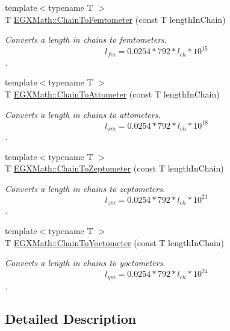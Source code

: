 \begin{DoxyCompactItemize}
{\footnotesize template$<$typename T $>$ }\\T \mbox{\hyperlink{group___e_g_x_math-_conversions-_length_conversions-_surveyors-_chain-_s_i_ga21bde6f9a920aced344185d4ed645183}{E\+G\+X\+Math\+::\+Chain\+To\+Femtometer}} (const T length\+In\+Chain)
\begin{DoxyCompactList}\small\item\em Converts a length in chains to femtometers. \[ l_{fm}=0.0254 * 792 * l_{ch} * 10^{15} \]. \end{DoxyCompactList}\item 
{\footnotesize template$<$typename T $>$ }\\T \mbox{\hyperlink{group___e_g_x_math-_conversions-_length_conversions-_surveyors-_chain-_s_i_ga1e983c3063080200438c09bdafa20e02}{E\+G\+X\+Math\+::\+Chain\+To\+Attometer}} (const T length\+In\+Chain)
\begin{DoxyCompactList}\small\item\em Converts a length in chains to attometers. \[ l_{am}=0.0254 * 792 * l_{ch} * 10^{18} \]. \end{DoxyCompactList}\item 
{\footnotesize template$<$typename T $>$ }\\T \mbox{\hyperlink{group___e_g_x_math-_conversions-_length_conversions-_surveyors-_chain-_s_i_ga5c9f25b27d059b6b458111270a20209a}{E\+G\+X\+Math\+::\+Chain\+To\+Zeptometer}} (const T length\+In\+Chain)
\begin{DoxyCompactList}\small\item\em Converts a length in chains to zeptometers. \[ l_{zm}=0.0254 * 792 * l_{ch} * 10^{21} \]. \end{DoxyCompactList}\item 
{\footnotesize template$<$typename T $>$ }\\T \mbox{\hyperlink{group___e_g_x_math-_conversions-_length_conversions-_surveyors-_chain-_s_i_gafcc220586dd2018bb921f109efa11d06}{E\+G\+X\+Math\+::\+Chain\+To\+Yoctometer}} (const T length\+In\+Chain)
\begin{DoxyCompactList}\small\item\em Converts a length in chains to yoctometers. \[ l_{ym}=0.0254 * 792 * l_{ch} * 10^{24} \]. \end{DoxyCompactList}\end{DoxyCompactItemize}


\subsection{Detailed Description}


